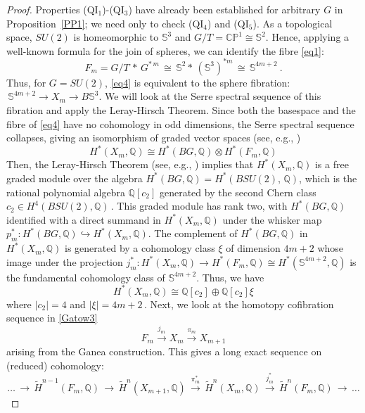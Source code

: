 \documentclass[11pt]{amsart}
\theoremstyle{definition}
\theoremstyle{remark}
\numberwithin{equation}{section}
\newcommand{\la}{\label}
\newcommand{\into}{\hookrightarrow}
\def\bS{\mathbb S}
\def\c{\mathbb{C}}
\def\Q{\mathbb{Q}}
\begin{document}
\begin{proof} Properties (QI$_{1}$)-(QI$_{3}$) have already been established for arbitrary $G$
in Proposition~\ref{PP1}; we need only to check (QI$_{4}$) and (QI$_{5}$).
As a topological space, $ SU(2) $ is homeomorphic to $ \bS^3 $ and $ G/T = \c {\mathbb P}^1 \cong \bS^2 $. Hence, applying a well-known formula for the join of spheres, we can identify the fibre \eqref{eq1}:
%
\begin{equation}
\la{eq6}
F_m = G/T\, \ast\, G^{\ast \,m} \,\cong \, 
\bS^2 \ast\, (\bS^3)^{\ast m} \,\cong\, \bS^{4m+2}\ .
\end{equation}
%
Thus, for $G = SU(2) $, \eqref{eq4} is equivalent to the sphere fibration: $\,\bS^{4m+2} \to X_m \to B\bS^3 $. We will look at the Serre spectral sequence of this fibration and apply the Leray-Hirsch Theorem. Since both the basespace and the fibre of \eqref{eq4} have no cohomology in odd dimensions, the Serre spectral sequence collapses, giving an isomorphism of graded vector spaces (see, e.g., \cite[Lemma~III.4.5(1)]{MT78})
%
$$
H^*(X_m, \Q) \cong H^{*}(BG, \Q) \otimes H^{*}(F_m, \Q) 
$$
%
Then, the Leray-Hirsch Theorem (see, e.g., \cite[Theorem~III.4.2]{MT78}) implies that $ H^*(X_m, \Q) $ is a free graded module over the algebra $ H^{*}(BG, \Q) = H^*(BSU(2),\,\Q) $, which is the rational polynomial algebra $ \Q[c_2] $  generated by the second Chern class $ c_2 \in H^4(BSU(2), \Q)\,$. 
This graded module has rank two, with  $ H^{*}(BG, \Q) $ identified with a direct summand in $ H^*(X_m, \Q) $ under the whisker map $ p_m^*: H^{*}(BG, \Q) \into H^*(X_m, \Q) $. The 
complement of $ H^{*}(BG, \Q) $ in  $ H^*(X_m, \Q) $ is generated by a cohomology class $ \xi $ of dimension $ 4m+2 $ whose image under the projection $ j_m^*: H^*(X_m, \Q) \to H^*(F_m, \Q) \cong H^*(\bS^{4m+2}, \Q) $ is the fundamental cohomology class of $ \bS^{4m+2}$. Thus, we have
%
\begin{equation}
\la{HXm}
H^*(X_m, \Q) \cong \Q[c_2] \oplus \Q[c_2] \xi
\end{equation}
%
where $ |c_2| = 4 $ and $ |\xi|= 4m+2 \,$. Next, we look at the homotopy cofibration sequence in \eqref{Gatow3}
%
\begin{equation}
\la{cfibm}
F_m \xrightarrow{j_m} X_m \xrightarrow{\pi_m} X_{m+1}
\end{equation}
%
arising from the Ganea construction. This gives a long exact sequence on (reduced) cohomology:
%
\begin{equation}
\la{longred}
\ldots\, \to\, \tilde{H}^{n-1}(F_m, \Q)\, \to \, \tilde{H}^{n}(X_{m+1}, \Q)\, \xrightarrow{\pi_m^*}\,  \tilde{H}^{n}(X_{m}, \Q)\, \xrightarrow{j_m^*}\, \tilde{H}^{n}(F_{m}, \Q) \,\to\, \ldots 

\end{equation}
\end{proof}
\end{document}
